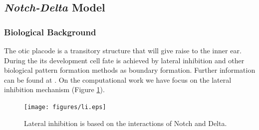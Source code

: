 \documentclass[a4paper, 11pt]{article}
\begin{document}
  \subsection{\textit{Notch-Delta} Model}
  \subsubsection{Biological Background}
  The otic placode is a transitory structure that will give raise to the inner ear.
  During the its development cell fate is achieved by lateral inhibition and other biological pattern formation methods as boundary formation.
  Further information can be found at \citep{alsina04}.
  On the computational work we have focus on the lateral inhibition mechanism (Figure \ref{li}).
  \begin{figure}[!t]
    \begin{center}
      \texttt{[image: figures/li.eps]}
      \caption{Lateral inhibition is based on the interactions of Notch and Delta.\label{li}}
    \end{center}
  \end{figure}
\end{document}

